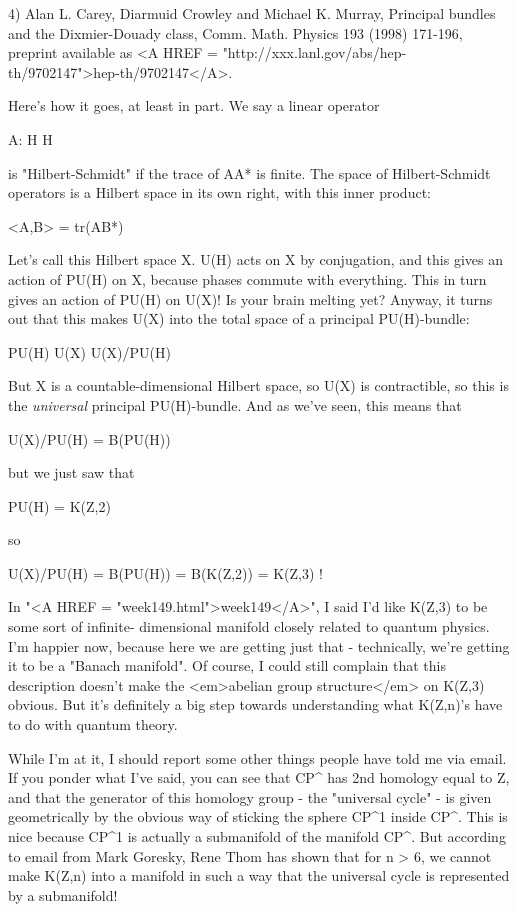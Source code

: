 4) Alan L. Carey, Diarmuid Crowley and Michael K. Murray, Principal 
bundles and the Dixmier-Douady class, Comm. Math. Physics 193 (1998)
171-196, preprint available as <A HREF = "http://xxx.lanl.gov/abs/hep-th/9702147">hep-th/9702147</A>. 

Here's how it goes, at least in part.  We say a linear operator 

A: H \to  H

is "Hilbert-Schmidt" if the trace of AA* is finite.  The space 
of Hilbert-Schmidt operators is a Hilbert space in its own right, 
with this inner product:

<A,B> = tr(AB*)

Let's call this Hilbert space X.  U(H) acts on X by conjugation, and 
this gives an action of PU(H) on X, because phases commute with everything.  
This in turn gives an action of PU(H) on U(X)!  Is your brain melting yet?  
Anyway, it turns out that this makes U(X) into the total space of a 
principal PU(H)-bundle:

PU(H) \to  U(X) \to  U(X)/PU(H)

But X is a countable-dimensional Hilbert space, so U(X) is contractible, 
so this is the \emph{universal} principal PU(H)-bundle.  And as we've seen, 
this means that 

U(X)/PU(H) = B(PU(H)) 

but we just saw that

PU(H) = K(Z,2)

so 

U(X)/PU(H) = B(PU(H)) = B(K(Z,2)) = K(Z,3) !

In "<A HREF = "week149.html">week149</A>", I said I'd like K(Z,3) to be some sort of infinite-
dimensional manifold closely related to quantum physics.   I'm 
happier now, because here we are getting just that - technically,
we're getting it to be a "Banach manifold".   Of course, I could 
still complain that this description doesn't make the <em>abelian 
group structure</em> on K(Z,3) obvious.  But it's definitely a big 
step towards understanding what K(Z,n)'s have to do with quantum 
theory.  

While I'm at it, I should report some other things people have told me
via email.  If you ponder what I've said, you can see that
CP^{\infty } has 2nd homology equal to Z, and that the
generator of this homology group - the "universal cycle" -
is given geometrically by the obvious way of sticking the sphere
CP^{1} inside CP^{\infty }.  This is nice because
CP^{1} is actually a submanifold of the manifold
CP^{\infty }.  But according to email from Mark Goresky, Rene
Thom has shown that for n > 6, we cannot make K(Z,n) into a
manifold in such a way that the universal cycle is represented by a
submanifold!

